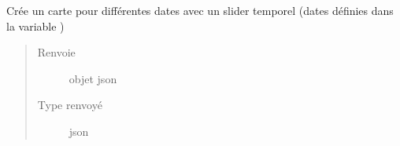 \documentclass[letterpaper,10pt,french]{sphinxmanual}
\begin{document}
\begin{fulllineitems}
\begin{fulllineitems}
\begin{quote}
\begin{description}
\end{description}\end{quote}

\end{fulllineitems}


\begin{fulllineitems}
\label{\detokenize{app.home.content_gen:app.home.content_gen.map_generation.CaniculePlot.plot_cursor}}
\sphinxAtStartPar
Crée un carte pour différentes dates avec un slider temporel
(dates définies dans la variable )
\begin{quote}\begin{description}
\item[{Renvoie}] \leavevmode
\sphinxAtStartPar
objet json

\item[{Type renvoyé}] \leavevmode
\sphinxAtStartPar
json

\end{description}\end{quote}

\end{fulllineitems}


\begin{fulllineitems}
\label{\detokenize{app.home.content_gen:app.home.content_gen.map_generation.CaniculePlot.read_json}}
\end{fulllineitems}


\end{fulllineitems}

\end{document}
